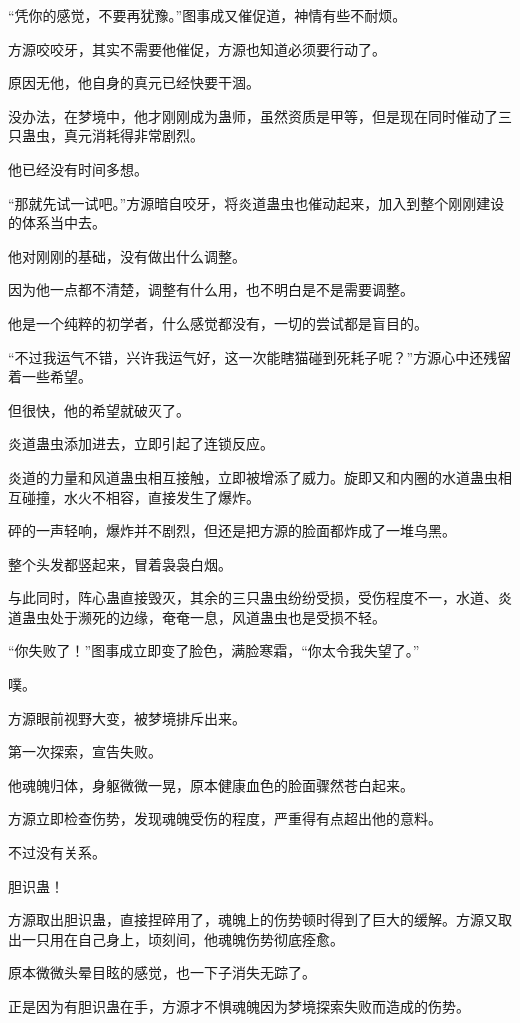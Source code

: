 \begin{this_body}
“凭你的感觉，不要再犹豫。”图事成又催促道，神情有些不耐烦。

方源咬咬牙，其实不需要他催促，方源也知道必须要行动了。

原因无他，他自身的真元已经快要干涸。

没办法，在梦境中，他才刚刚成为蛊师，虽然资质是甲等，但是现在同时催动了三只蛊虫，真元消耗得非常剧烈。

他已经没有时间多想。

“那就先试一试吧。”方源暗自咬牙，将炎道蛊虫也催动起来，加入到整个刚刚建设的体系当中去。

他对刚刚的基础，没有做出什么调整。

因为他一点都不清楚，调整有什么用，也不明白是不是需要调整。

他是一个纯粹的初学者，什么感觉都没有，一切的尝试都是盲目的。

“不过我运气不错，兴许我运气好，这一次能瞎猫碰到死耗子呢？”方源心中还残留着一些希望。

但很快，他的希望就破灭了。

炎道蛊虫添加进去，立即引起了连锁反应。

炎道的力量和风道蛊虫相互接触，立即被增添了威力。旋即又和内圈的水道蛊虫相互碰撞，水火不相容，直接发生了爆炸。

砰的一声轻响，爆炸并不剧烈，但还是把方源的脸面都炸成了一堆乌黑。

整个头发都竖起来，冒着袅袅白烟。

与此同时，阵心蛊直接毁灭，其余的三只蛊虫纷纷受损，受伤程度不一，水道、炎道蛊虫处于濒死的边缘，奄奄一息，风道蛊虫也是受损不轻。

“你失败了！”图事成立即变了脸色，满脸寒霜，“你太令我失望了。”

噗。

方源眼前视野大变，被梦境排斥出来。

第一次探索，宣告失败。

他魂魄归体，身躯微微一晃，原本健康血色的脸面骤然苍白起来。

方源立即检查伤势，发现魂魄受伤的程度，严重得有点超出他的意料。

不过没有关系。

胆识蛊！

方源取出胆识蛊，直接捏碎用了，魂魄上的伤势顿时得到了巨大的缓解。方源又取出一只用在自己身上，顷刻间，他魂魄伤势彻底痊愈。

原本微微头晕目眩的感觉，也一下子消失无踪了。

正是因为有胆识蛊在手，方源才不惧魂魄因为梦境探索失败而造成的伤势。


\end{this_body}
